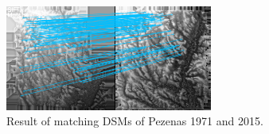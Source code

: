 \begin{figure}[htbp]
\begin{center}
{\begin{minipage}[t]{0.48\linewidth}
                \centering
                \includegraphics[width=6.8cm]{images/Chapitre3/Homol-SIFT-2DRANSAC_MEC-Malt_Tapas_1971_MEC-Malt_2015.png}
            \end{minipage}%
        }
        \caption{Result of matching DSMs of Pezenas 1971 and 2015.}
        \label{Match result}
    \end{center}
\end{figure} 



